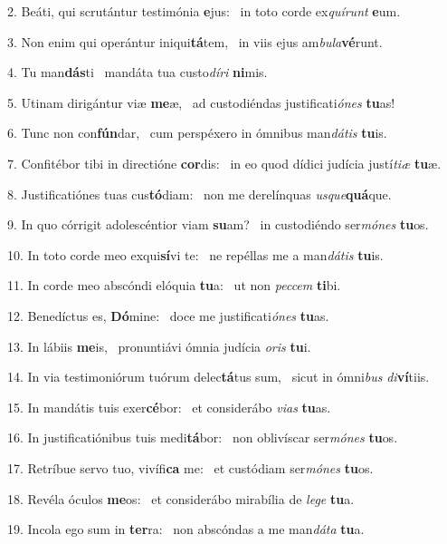 2. Beáti, qui scrutántur testimónia \textbf{e}jus: \ast\  in toto corde ex\textit{quí}\textit{runt} \textbf{e}um.\

3. Non enim qui operántur iniqui\textbf{tá}tem, \ast\  in viis ejus am\textit{bu}\textit{la}\textbf{vé}runt.\

4. Tu man\textbf{dás}ti \ast\  mandáta tua custo\textit{dí}\textit{ri} \textbf{ni}mis.\

5. Utinam dirigántur viæ \textbf{me}æ, \ast\  ad custodiéndas justificati\textit{ó}\textit{nes} \textbf{tu}as!\

6. Tunc non con\textbf{fún}dar, \ast\  cum perspéxero in ómnibus man\textit{dá}\textit{tis} \textbf{tu}is.\

7. Confitébor tibi in directióne \textbf{cor}dis: \ast\  in eo quod dídici judícia justí\textit{ti}\textit{æ} \textbf{tu}æ.\

8. Justificatiónes tuas cus\textbf{tó}diam: \ast\  non me derelínquas \textit{us}\textit{que}\textbf{quá}que.\

9. In quo córrigit adolescéntior viam \textbf{su}am? \ast\  in custodiéndo ser\textit{mó}\textit{nes} \textbf{tu}os.\

10. In toto corde meo exqui\textbf{sí}vi te: \ast\  ne repéllas me a man\textit{dá}\textit{tis} \textbf{tu}is.\

11. In corde meo abscóndi elóquia \textbf{tu}a: \ast\  ut non \textit{pec}\textit{cem} \textbf{ti}bi.\

12. Benedíctus es, \textbf{Dó}mine: \ast\  doce me justificati\textit{ó}\textit{nes} \textbf{tu}as.\

13. In lábiis \textbf{me}is, \ast\  pronuntiávi ómnia judícia \textit{o}\textit{ris} \textbf{tu}i.\

14. In via testimoniórum tuórum delec\textbf{tá}tus sum, \ast\  sicut in ómni\textit{bus} \textit{di}\textbf{ví}tiis.\

15. In mandátis tuis exer\textbf{cé}bor: \ast\  et considerábo \textit{vi}\textit{as} \textbf{tu}as.\

16. In justificatiónibus tuis medi\textbf{tá}bor: \ast\  non oblivíscar ser\textit{mó}\textit{nes} \textbf{tu}os.\

17. Retríbue servo tuo, vivífi\textbf{ca} me: \ast\  et custódiam ser\textit{mó}\textit{nes} \textbf{tu}os.\

18. Revéla óculos \textbf{me}os: \ast\  et considerábo mirabília de \textit{le}\textit{ge} \textbf{tu}a.\

19. Incola ego sum in \textbf{ter}ra: \ast\  non abscóndas a me man\textit{dá}\textit{ta} \textbf{tu}a.\

